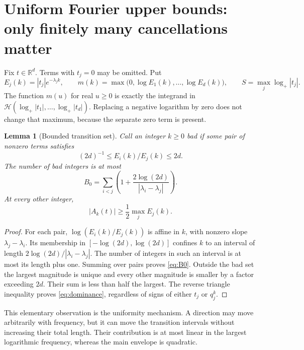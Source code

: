 \documentclass[11pt,a4paper]{article}
\numberwithin{equation}{section}
\newtheorem{lemma}[theorem]{Lemma}
\theoremstyle{definition}
\theoremstyle{remark}\newtheorem{remark}[theorem]{Remark}
\newcommand{\R}{\mathbb R}\newcommand{\N}{\mathbb N}
\newcommand{\He}{\mathcal H}
\newcommand{\lp}{\log_+}
\begin{document}
\section{Uniform Fourier upper bounds: only finitely many cancellations matter}
\label{sec:upper}

Fix $t\in\R^d$. Terms with $t_j=0$ may be omitted. Put
\begin{equation}
 E_j(k)=|t_j|e^{-\lambda_jk},\qquad
 m(k)=\max\bigl(0,\log E_1(k),\ldots,\log E_d(k)\bigr),\qquad
 S=\max_j\lp|t_j|.
 \label{eq:Ek}
\end{equation}
The function $m(u)$ for real $u\ge0$ is exactly the integrand in
$\He(\lp|t_1|,\ldots,\lp|t_d|)$. Replacing a negative logarithm by zero does
not change that maximum, because the separate zero term is present.

\begin{lemma}[Bounded transition set]
\label{lem:bad}
Call an integer $k\ge0$ bad if some pair of nonzero terms satisfies
\[
 (2d)^{-1}\le E_i(k)/E_j(k)\le2d.
\]
The number of bad integers is at most
\begin{equation}
 B_0=\sum_{i<j}\left(1+\frac{2\log(2d)}{|\lambda_i-\lambda_j|}\right).
 \label{eq:B0}
\end{equation}
At every other integer,
\begin{equation}
 |A_k(t)|\ge\frac12\max_jE_j(k).
 \label{eq:dominance}
\end{equation}
\end{lemma}
\begin{proof}
For each pair, $\log(E_i(k)/E_j(k))$ is affine in $k$, with nonzero slope
$\lambda_j-\lambda_i$. Its membership in
$[-\log(2d),\log(2d)]$ confines $k$ to an interval of length
$2\log(2d)/|\lambda_i-\lambda_j|$. The number of integers in such an interval
is at most its length plus one. Summing over pairs proves \eqref{eq:B0}.
Outside the bad set the largest magnitude is unique and every other
magnitude is smaller by a factor exceeding $2d$. Their sum is less than half
the largest. The reverse triangle inequality proves \eqref{eq:dominance},
regardless of signs of either $t_j$ or $q_j^k$.
\end{proof}

This elementary observation is the uniformity mechanism. A direction may
move arbitrarily with frequency, but it can move the transition intervals
without increasing their total length. Their contribution is at most linear
in the largest logarithmic frequency, whereas the main envelope is quadratic.
\end{document}
